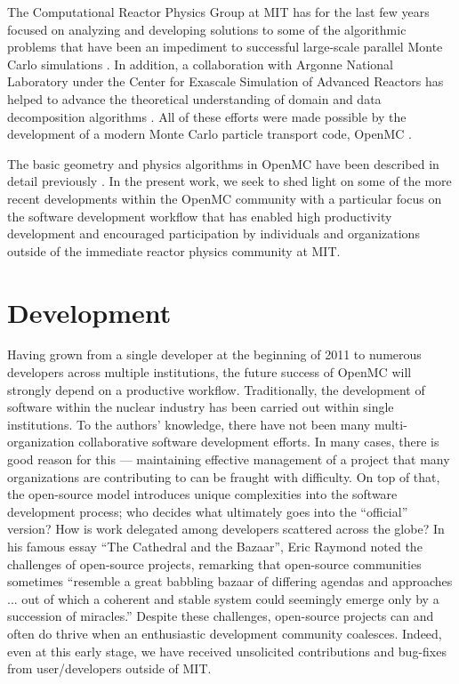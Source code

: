 \documentclass{ansconf}
\begin{document}
The Computational Reactor Physics Group at MIT has for the last few years
focused on analyzing and developing solutions to some of the algorithmic
problems that have been an impediment to successful large-scale parallel Monte
Carlo simulations \cite{pnst-romano-2011, nse-romano-2012,
  trans-romano-2012}. In addition, a collaboration with Argonne National
Laboratory under the Center for Exascale Simulation of Advanced Reactors has
helped to advance the theoretical understanding of domain and data decomposition
algorithms \cite{jcp-siegel-2012, jcp-siegel-2013}. All of these efforts
were made possible by the development of a modern Monte Carlo particle transport
code, OpenMC \cite{openmc-github-2012}.

The basic geometry and physics algorithms in OpenMC have been described in
detail previously \cite{ane-romano-2013}. In the present work, we seek to shed
light on some of the more recent developments within the OpenMC community with a
particular focus on the software development workflow that has enabled high
productivity development and encouraged participation by individuals and
organizations outside of the immediate reactor physics community at MIT.

\section{Development}

Having grown from a single developer at the beginning of 2011 to numerous
developers across multiple institutions, the future success of OpenMC will
strongly depend on a productive workflow. Traditionally, the development of
software within the nuclear industry has been carried out within single
institutions. To the authors' knowledge, there have not been many
multi-organization collaborative software development efforts. In many cases,
there is good reason for this --- maintaining effective management of a project
that many organizations are contributing to can be fraught with difficulty. On
top of that, the open-source model introduces unique complexities into the
software development process; who decides what ultimately goes into the
``official'' version? How is work delegated among developers scattered across
the globe?  In his famous essay ``The Cathedral and the Bazaar'', Eric Raymond
noted the challenges of open-source projects, remarking that \cite{raymond-1999}
open-source communities sometimes ``resemble a great babbling bazaar of
differing agendas and approaches ... out of which a coherent and stable system
could seemingly emerge only by a succession of miracles.'' Despite these
challenges, open-source projects can and often do thrive when an enthusiastic
development community coalesces. Indeed, even at this early stage, we have
received unsolicited contributions and bug-fixes from user/developers outside of
MIT.
\end{document}
